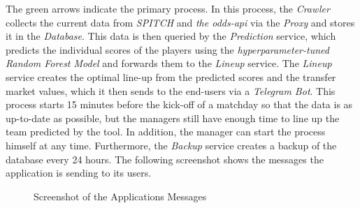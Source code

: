 The green arrows indicate the primary process. In this process, the \emph{Crawler} collects the current data from \emph{SPITCH} and \emph{the odds-api} via the \emph{Proxy} and stores it in the \emph{Database}. This data is then queried by the \emph{Prediction} service, which predicts the individual scores of the players using the \emph{hyperparameter-tuned Random Forest Model} and forwards them to the \emph{Lineup} service. The \emph{Lineup} service creates the optimal line-up from the predicted scores and the transfer market values, which it then sends to the end-users via a \emph{Telegram Bot}. This process starts 15 minutes before the kick-off of a matchday so that the data is as up-to-date as possible, but the managers still have enough time to line up the team predicted by the tool. In addition, the manager can start the process himself at any time. Furthermore, the \emph{Backup} service creates a backup of the database every 24 hours. The following screenshot shows the messages the application is sending to its users.

\vskip 0.5cm

\begin{figure}[H]
    \centering
    \captionsetup{justification=centering}
    \caption{Screenshot of the Applications Messages}
    \label{fig:screenshot-telegram}
\end{figure}

